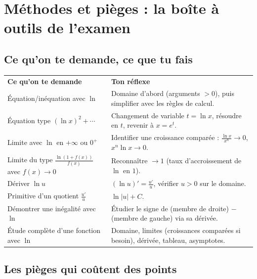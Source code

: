 \documentclass[11pt,a4paper]{article}
\begin{document}
\section{Méthodes et pièges : la boîte à outils de l'examen}

\subsection{Ce qu'on te demande, ce que tu fais}

\begin{center}
\renewcommand{\arraystretch}{1.45}
\sffamily\small
\begin{tabular}{>{\raggedright\arraybackslash}p{7.2cm} >{\raggedright\arraybackslash}p{8cm}}
\rowcolor{qtealdark} \color{white}\bfseries Ce qu'on te demande & \color{white}\bfseries Ton réflexe \\
\rowcolor{tealpale} Équation/inéquation avec $\ln$ & Domaine d'abord (arguments $>0$), puis simplifier avec les règles de calcul. \\
Équation type $(\ln x)^2+\cdots$ & Changement de variable $t=\ln x$, résoudre en $t$, revenir à $x=e^t$. \\
\rowcolor{tealpale} Limite avec $\ln$ en $+\infty$ ou $0^+$ & Identifier une croissance comparée : $\frac{\ln x}{x^n}\to0$, $x^n\ln x\to0$. \\
Limite du type $\frac{\ln(1+f(x))}{f(x)}$ avec $f(x)\to0$ & Reconnaître $\to1$ (taux d'accroissement de $\ln$ en $1$). \\
\rowcolor{tealpale} Dériver $\ln u$ & $(\ln u)' = \frac{u'}{u}$, vérifier $u>0$ sur le domaine. \\
Primitive d'un quotient $\frac{u'}{u}$ & $\ln|u| + C$. \\
\rowcolor{tealpale} Démontrer une inégalité avec $\ln$ & Étudier le signe de (membre de droite) $-$ (membre de gauche) via sa dérivée. \\
Étude complète d'une fonction avec $\ln$ & Domaine, limites (croissances comparées si besoin), dérivée, tableau, asymptotes. \\
\end{tabular}
\end{center}

\subsection{Les pièges qui coûtent des points}
\end{document}
